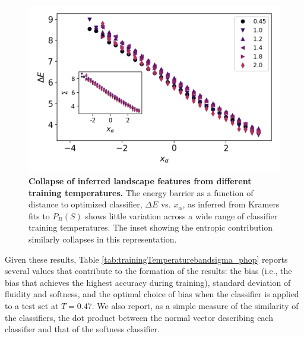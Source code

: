 \documentclass[aps,reprint,superscriptaddress,nofootinbib, notitlepage,prl]{revtex4-2}
\begin{document}
\begin{figure}[ht]
    \centering
    \includegraphics[width =1\linewidth]{Figure_4.png}
    \caption{\textbf{Collapse of inferred landscape features from different
training temperatures.} The energy barrier as a function of distance to optimized classifier, $\Delta E$ vs. $x_\alpha$, as inferred from Kramers fits to $P_R(S)$ shows little variation across a wide range of classifier training temperatures. The inset showing the entropic contribution similarly collapses in this representation.}
    \label{fig:barrierVsClassifierDirection}
\end{figure}


Given these results, Table \ref{tab:trainingTemperaturebandsigma_phop} reports several values that contribute to the formation of the results: the bias (i.e., the bias that achieves the highest accuracy during training), standard deviation of fluidity and softness, and the optimal choice of bias when the classifier is applied to a test set at $T=0.47$. We also report, as a simple measure of the similarity of the classifiers, the dot product between the normal vector describing each classifier and that of the softness classifier.
\end{document}
